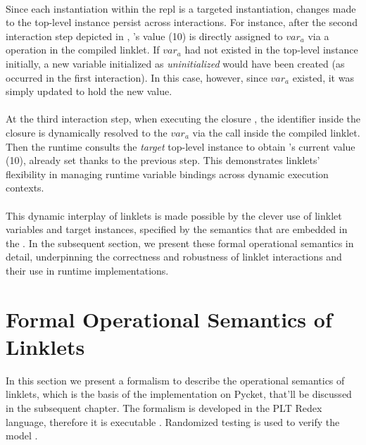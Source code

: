 		\paragraph{}%
			Since each instantiation within the \gls{repl} is a targeted instantiation, changes made to the top-level instance persist across interactions. For instance, after the second interaction step depicted in , 's value (10) is directly assigned to $var_a$ via a  operation in the compiled linklet. If $var_a$ had not existed in the top-level instance initially, a new variable initialized as \emph{uninitialized} would have been created (as occurred in the first interaction). In this case, however, since $var_a$ existed, it was simply updated to hold the new value.

		\paragraph{}%
			At the third interaction step, when executing the closure , the identifier  inside the closure is dynamically resolved to the $var_a$ via the  call inside the compiled linklet. Then the runtime consults the \emph{target} top-level instance to obtain 's current value (10), already set thanks to the previous step. This demonstrates linklets' flexibility in managing runtime variable bindings across dynamic execution contexts.

		\paragraph{}%
			This dynamic interplay of linklets is made possible by the clever use of linklet variables and target instances, specified by the semantics that are embedded in the . In the subsequent section, we present these formal operational semantics in detail, underpinning the correctness and robustness of linklet interactions and their use in runtime implementations.


	\section[\texorpdfstring{Formal Operational Semantics of Linklets}{Formal Semantics for Linklets}]{Formal Operational Semantics of Linklets}

		\begin{paragraph-here}%
			In this section we present a formalism to describe the operational semantics of linklets, which is the basis of the implementation on Pycket, that'll be discussed in the subsequent chapter. The formalism is developed in the PLT Redex language, therefore it is executable \cite{redexBook}. Randomized testing is used to verify the model \cite{randomizedTesting}.
		\end{paragraph-here}

